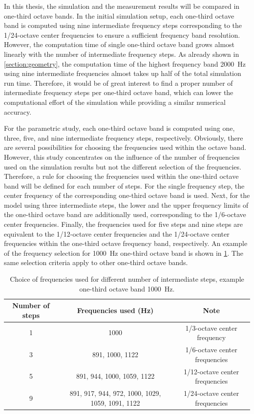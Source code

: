 In this thesis, the simulation and the measurement results will be compared in one-third octave bands.
In the initial simulation setup, each one-third octave band is computed using nine intermediate frequency steps corresponding to the 1/24-octave center frequencies to ensure a sufficient frequency band resolution.
However, the computation time of single one-third octave band grows almost linearly with the number of intermediate frequency steps.
As already shown in \cref{section:geometry}, the computation time of the highest frequency band \SI{2000}{Hz} using nine intermediate frequencies almost takes up half of the total simulation run time.
Therefore, it would be of great interest to find a proper number of intermediate frequency steps per one-third octave band, which can lower the computational effort of the simulation while providing a similar numerical accuracy.

For the parametric study, each one-third octave band is computed using one, three, five, and nine intermediate frequency steps, respectively. Obviously, there are several possibilities for choosing the frequencies used within the octave band. However, this study concentrates on the influence of the number of frequencies used on the simulation results but not the different selection of the frequencies. Therefore, a rule for choosing the frequencies used within the one-third octave band will be defined for each number of steps. For the single frequency step, the center frequency of the corresponding one-third octave band is used. Next, for the model using three intermediate steps, the lower and the upper frequency limits of the one-third octave band are additionally used, corresponding to the 1/6-octave center frequencies. Finally, the frequencies used for five steps and nine steps are equivalent to the 1/12-octave center frequencies and the 1/24-octave center frequencies within the one-third octave frequency band, respectively. An example of the frequency selection for \SI{1000}{\hertz} one-third octave band is shown in \cref{tab:variation_freq_steps}. The same selection criteria apply to other one-third octave bands.

\begin{table}[H]
	\caption{Choice of frequencies used for different number of intermediate steps, example one-third octave band \SI{1000}{\hertz}.}
	\centering
	\begin{tabular}{ccc}
		\toprule
		Number of steps    &  Frequencies used (Hz) & Note  \\
		\midrule
		1    &  1000  & 1/3-octave center frequency\\
		3  	 &  891, 1000, 1122 & 1/6-octave center frequencies \\
		5  	 &  891, 944, 1000, 1059, 1122 & 1/12-octave center frequencies\\
		9    &  891, 917, 944, 972, 1000, 1029, 1059, 1091, 1122 & 1/24-octave center frequencies \\
		\bottomrule
	\end{tabular}
	\label{tab:variation_freq_steps}
\end{table}